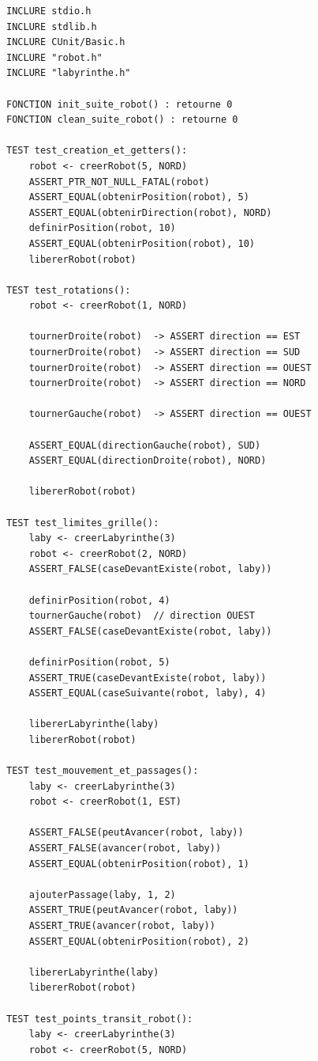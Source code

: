 \begin{verbatim}
INCLURE stdio.h
INCLURE stdlib.h
INCLURE CUnit/Basic.h
INCLURE "robot.h"
INCLURE "labyrinthe.h"

FONCTION init_suite_robot() : retourne 0
FONCTION clean_suite_robot() : retourne 0

TEST test_creation_et_getters():
    robot <- creerRobot(5, NORD)
    ASSERT_PTR_NOT_NULL_FATAL(robot)
    ASSERT_EQUAL(obtenirPosition(robot), 5)
    ASSERT_EQUAL(obtenirDirection(robot), NORD)
    definirPosition(robot, 10)
    ASSERT_EQUAL(obtenirPosition(robot), 10)
    libererRobot(robot)

TEST test_rotations():
    robot <- creerRobot(1, NORD)

    tournerDroite(robot)  -> ASSERT direction == EST
    tournerDroite(robot)  -> ASSERT direction == SUD
    tournerDroite(robot)  -> ASSERT direction == OUEST
    tournerDroite(robot)  -> ASSERT direction == NORD

    tournerGauche(robot)  -> ASSERT direction == OUEST

    ASSERT_EQUAL(directionGauche(robot), SUD)
    ASSERT_EQUAL(directionDroite(robot), NORD)

    libererRobot(robot)

TEST test_limites_grille():
    laby <- creerLabyrinthe(3)
    robot <- creerRobot(2, NORD)
    ASSERT_FALSE(caseDevantExiste(robot, laby))

    definirPosition(robot, 4)
    tournerGauche(robot)  // direction OUEST
    ASSERT_FALSE(caseDevantExiste(robot, laby))

    definirPosition(robot, 5)
    ASSERT_TRUE(caseDevantExiste(robot, laby))
    ASSERT_EQUAL(caseSuivante(robot, laby), 4)

    libererLabyrinthe(laby)
    libererRobot(robot)

TEST test_mouvement_et_passages():
    laby <- creerLabyrinthe(3)
    robot <- creerRobot(1, EST)

    ASSERT_FALSE(peutAvancer(robot, laby))
    ASSERT_FALSE(avancer(robot, laby))
    ASSERT_EQUAL(obtenirPosition(robot), 1)

    ajouterPassage(laby, 1, 2)
    ASSERT_TRUE(peutAvancer(robot, laby))
    ASSERT_TRUE(avancer(robot, laby))
    ASSERT_EQUAL(obtenirPosition(robot), 2)

    libererLabyrinthe(laby)
    libererRobot(robot)

TEST test_points_transit_robot():
    laby <- creerLabyrinthe(3)
    robot <- creerRobot(5, NORD)


\end{verbatim}
